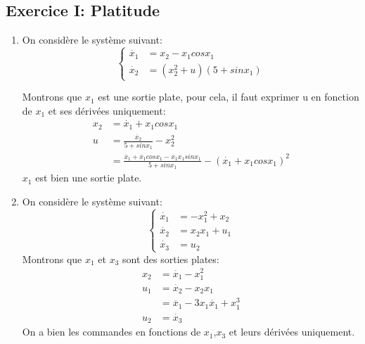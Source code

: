 \documentclass{../../td}{subfiles}
\begin{document}
\subsection*{Exercice I: Platitude}
\begin{enumerate}
\item On considère le système suivant:
\[
  \begin{cases}
\dot{x_1} &= x_2 - x_1 cos x_1\\
\dot{x_2} &= (x_2^2 + u)(5 + sinx_1)
\end{cases}
\]

Montrons que $x_1$ est une sortie plate, pour cela, il faut exprimer u en fonction de $x_1$ et ses dérivées uniquement:
\begin{align*}
x_2 &= \dot{x_1} + x_1 cos x_1\\
u &= \frac{\dot{x_2}}{5 + sin x_1} - x_2^2\\
&= \frac{\ddot{x_1} + \dot{x_1}cosx_1 - \dot{x_1}x_1 sinx_1}{5 + sin x_1} - (\dot{x_1} + x_1 cos x_1)^2
\end{align*}
$x_1$ est bien une sortie plate.

\item On considère le système suivant:
\[ \left\{\begin{matrix}
\dot{x_1} &= -x_1^2 + x_2\\
\dot{x_2} &= x_2x_1 + u_1\\
\dot{x_3} &= u_2
\end{matrix}\right. \]
Montrons que $x_1$ et $x_3$ sont des sorties plates:
\begin{align*}
x_2 &= \dot{x_1}- x_1^2 \\
u_1 &= \dot{x_2} - x_2 x_1\\
&= \ddot{x_1} - 3x_1 \dot{x_1} + x_1^3\\
u_2 &= \dot{x_3}
\end{align*}
On a bien les commandes en fonctions de $x_1$,$x_3$ et leurs dérivées uniquement.

\end{enumerate}
\end{document}
